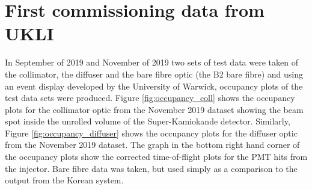 \section{First commissioning data from UKLI}

In September of 2019 and November of 2019 two sets of test data were taken of the collimator, the diffuser and the bare fibre optic (the B2 bare fibre) and using an event display developed by the University of Warwick, occupancy plots of the test data sets were produced. Figure \ref{fig:occupancy_coll} shows the occupancy plots for the collimator optic from the November 2019 dataset showing the beam spot inside the unrolled volume of the Super-Kamiokande detector. Similarly, Figure \ref{fig:occupancy_diffuser} shows the occupancy plots for the diffuser optic from the November 2019 dataset. The graph in the bottom right hand corner of the occupancy plots show the corrected time-of-flight plots for the PMT hits from the injector. Bare fibre data was taken, but used simply as a comparison to the output from the Korean system. 



